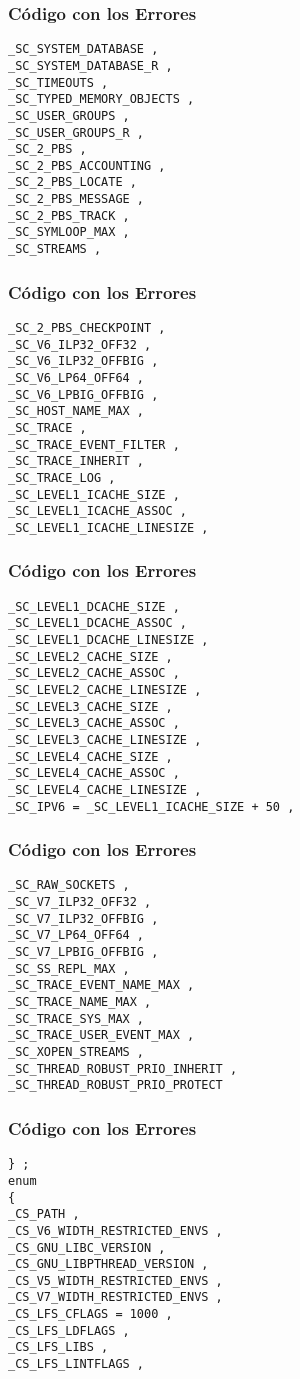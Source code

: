 \documentclass{beamer}
\begin{document}
\begin{frame}[fragile]
\frametitle{C\'odigo con los Errores}
\begin{lstlisting}[style=CStyle]
_SC_SYSTEM_DATABASE , 
_SC_SYSTEM_DATABASE_R , 
_SC_TIMEOUTS , 
_SC_TYPED_MEMORY_OBJECTS , 
_SC_USER_GROUPS , 
_SC_USER_GROUPS_R , 
_SC_2_PBS , 
_SC_2_PBS_ACCOUNTING , 
_SC_2_PBS_LOCATE , 
_SC_2_PBS_MESSAGE , 
_SC_2_PBS_TRACK , 
_SC_SYMLOOP_MAX , 
_SC_STREAMS , 
\end{lstlisting}
\end{frame}
\begin{frame}[fragile]
\frametitle{C\'odigo con los Errores}
\begin{lstlisting}[style=CStyle]
_SC_2_PBS_CHECKPOINT , 
_SC_V6_ILP32_OFF32 , 
_SC_V6_ILP32_OFFBIG , 
_SC_V6_LP64_OFF64 , 
_SC_V6_LPBIG_OFFBIG , 
_SC_HOST_NAME_MAX , 
_SC_TRACE , 
_SC_TRACE_EVENT_FILTER , 
_SC_TRACE_INHERIT , 
_SC_TRACE_LOG , 
_SC_LEVEL1_ICACHE_SIZE , 
_SC_LEVEL1_ICACHE_ASSOC , 
_SC_LEVEL1_ICACHE_LINESIZE , 
\end{lstlisting}
\end{frame}
\begin{frame}[fragile]
\frametitle{C\'odigo con los Errores}
\begin{lstlisting}[style=CStyle]
_SC_LEVEL1_DCACHE_SIZE , 
_SC_LEVEL1_DCACHE_ASSOC , 
_SC_LEVEL1_DCACHE_LINESIZE , 
_SC_LEVEL2_CACHE_SIZE , 
_SC_LEVEL2_CACHE_ASSOC , 
_SC_LEVEL2_CACHE_LINESIZE , 
_SC_LEVEL3_CACHE_SIZE , 
_SC_LEVEL3_CACHE_ASSOC , 
_SC_LEVEL3_CACHE_LINESIZE , 
_SC_LEVEL4_CACHE_SIZE , 
_SC_LEVEL4_CACHE_ASSOC , 
_SC_LEVEL4_CACHE_LINESIZE , 
_SC_IPV6 = _SC_LEVEL1_ICACHE_SIZE + 50 , 
\end{lstlisting}
\end{frame}
\begin{frame}[fragile]
\frametitle{C\'odigo con los Errores}
\begin{lstlisting}[style=CStyle]
_SC_RAW_SOCKETS , 
_SC_V7_ILP32_OFF32 , 
_SC_V7_ILP32_OFFBIG , 
_SC_V7_LP64_OFF64 , 
_SC_V7_LPBIG_OFFBIG , 
_SC_SS_REPL_MAX , 
_SC_TRACE_EVENT_NAME_MAX , 
_SC_TRACE_NAME_MAX , 
_SC_TRACE_SYS_MAX , 
_SC_TRACE_USER_EVENT_MAX , 
_SC_XOPEN_STREAMS , 
_SC_THREAD_ROBUST_PRIO_INHERIT , 
_SC_THREAD_ROBUST_PRIO_PROTECT 
\end{lstlisting}
\end{frame}
\begin{frame}[fragile]
\frametitle{C\'odigo con los Errores}
\begin{lstlisting}[style=CStyle]
} ; 
enum 
{ 
_CS_PATH , 
_CS_V6_WIDTH_RESTRICTED_ENVS , 
_CS_GNU_LIBC_VERSION , 
_CS_GNU_LIBPTHREAD_VERSION , 
_CS_V5_WIDTH_RESTRICTED_ENVS , 
_CS_V7_WIDTH_RESTRICTED_ENVS , 
_CS_LFS_CFLAGS = 1000 , 
_CS_LFS_LDFLAGS , 
_CS_LFS_LIBS , 
_CS_LFS_LINTFLAGS , 
\end{lstlisting}
\end{frame}
\end{document}
